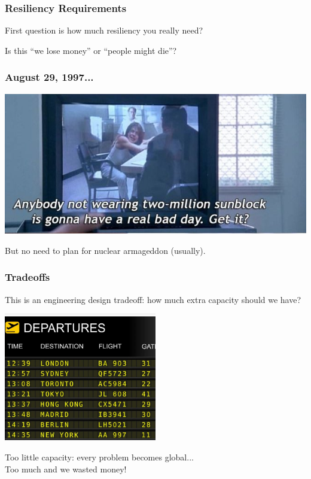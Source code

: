 \begin{frame}
\frametitle{Resiliency Requirements}

First question is how much resiliency you really need?


Is this ``we lose money'' or ``people might die''?



\end{frame}

\begin{frame}
\frametitle{August 29, 1997...}

\begin{center}
	\includegraphics[width= \textwidth]{images/judgementday.png}
\end{center}

But no need to plan for nuclear armageddon (usually).

\end{frame}

\begin{frame}
\frametitle{Tradeoffs}

This is an engineering design tradeoff: how much extra capacity should we have?

\begin{center}
	\includegraphics[width=0.5\textwidth]{images/flightdelay.jpg}
\end{center}

Too little capacity: every problem becomes global...\\
\quad Too much and we wasted money!

\end{frame}

